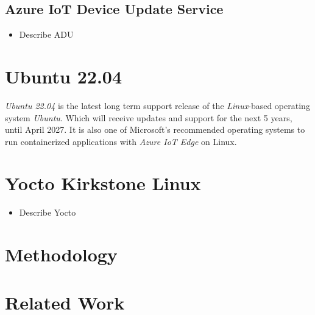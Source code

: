 \subsection{Azure IoT Device Update Service}
\begin{tcolorbox}[title=TODO]
    \begin{itemize}
        \item Describe ADU
    \end{itemize}
\end{tcolorbox}

\section{Ubuntu 22.04}
\textit{Ubuntu 22.04} is the latest long term support release of the \textit{Linux}-based operating system \textit{Ubuntu}. Which will receive updates and support
for the next 5 years, until April 2027\cite{ubuntu-releasenote}. It is also one of
Microsoft's recommended operating systems to run containerized applications with
\textit{Azure IoT Edge} on Linux\cite{msdoc-supportetplatforms}.

\section{Yocto Kirkstone Linux}
\begin{tcolorbox}[title=TODO]
    \begin{itemize}
        \item Describe Yocto
    \end{itemize}
\end{tcolorbox}

\section{Methodology}
\section{Related Work}
